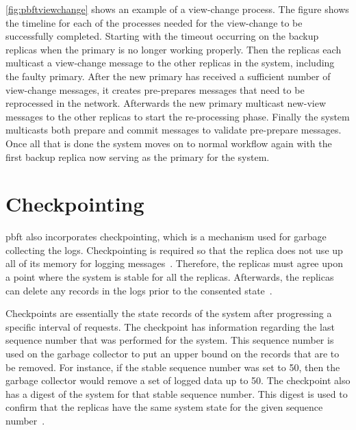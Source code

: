 \autoref{fig:pbftviewchange} shows an example of a view-change process. The figure shows the timeline for each of the processes needed for the view-change to be successfully completed. Starting with the timeout occurring on the backup replicas when the primary is no longer working properly. Then the replicas each multicast a view-change message to the other replicas in the system, including the faulty primary. After the new primary has received a sufficient number of view-change messages, it creates pre-prepares messages that need to be reprocessed in the network. Afterwards the new primary multicast new-view messages to the other replicas to start the re-processing phase. Finally the system multicasts both prepare and commit messages to validate pre-prepare messages. Once all that is done the system moves on to normal workflow again with the first backup replica now serving as the primary for the system.
\fi

\section{Checkpointing}
\label{sec:checkpoint}
\ac{pbft} also incorporates checkpointing, which is a mechanism used for garbage collecting the logs. Checkpointing is required so that the replica does not use up all of its memory for logging messages~\cite[p.~261]{BOOK:BuildDepDistSyst}. Therefore, the replicas must agree upon a point where the system is stable for all the replicas. Afterwards, the replicas can delete any records in the logs prior to the consented state~\cites[p.~5]{PAPER:OGPBFT}[p.~410]{PAPER:PBFTRecovery}.

Checkpoints are essentially the state records of the system after progressing a specific interval of requests. The checkpoint has information regarding the last sequence number that was performed for the system. This sequence number is used on the garbage collector to put an upper bound on the records that are to be removed. For instance, if the stable sequence number was set to 50, then the garbage collector would remove a set of logged data up to 50. The checkpoint also has a digest of the system for that stable sequence number. This digest is used to confirm that the replicas have the same system state for the given sequence number~\cites[p.~5]{PAPER:OGPBFT}[p.~410]{PAPER:PBFTRecovery}.

